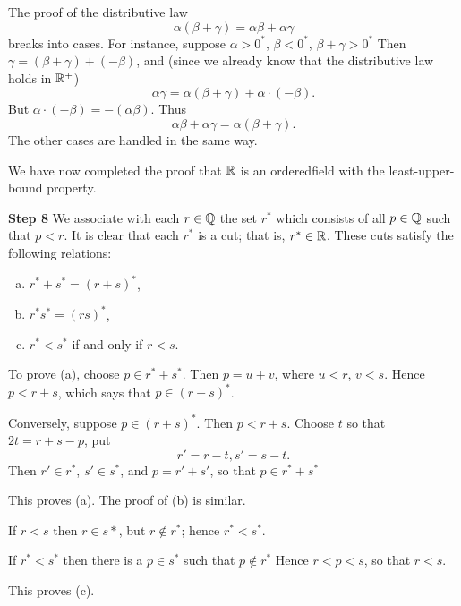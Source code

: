 The proof of the distributive law
\begin{equation*}
    \alpha(\beta + \gamma) = \alpha\beta + \alpha\gamma
\end{equation*}
breaks into cases. For instance, suppose $\alpha> 0^*$, $\beta <0^*$, $\beta + \gamma > 0^*$ Then $\gamma = (\beta + \gamma) + (- \beta)$, and (since we already know that the distributive law holds in ${\protect\mathbb R}^+$)
\begin{equation*}
    \alpha\gamma = \alpha(\beta+\gamma) + \alpha \cdot (-\beta).
\end{equation*}
But $\alpha \cdot (-\beta) = -(\alpha\beta)$. Thus
\begin{equation*}
    \alpha\beta + \alpha\gamma = \alpha(\beta + \gamma).
\end{equation*}
The other cases are handled in the same way.

We have now completed the proof that ${\protect\mathbb R}$ is an orderedfield with the least-upper-bound property.

\textbf{Step 8} 
We associate with each $r\in {\protect\mathbb Q} $ the set $r^*$ 
which consists of all $p \in {\protect\mathbb Q} $ such that $p < r$. 
It is clear that each $r^*$ is a cut; 
that is, $r^* \in {\protect\mathbb R}$. 
These cuts satisfy the following relations:
\begin{enumerate}[(a)]
    \item $r^* + s^* = (r+s)^*$,
    \item $r^* s^* = (rs)^*$,
    \item $r^* < s^*$ if and only if $r < s$.
\end{enumerate}

To prove (a), choose $p \in r^* + s^*$. Then $p=u+v$, where $u<r$, $v<s$.
Hence $p < r +s$, which says that $p \in (r + s)^*$.

Conversely, suppose $p \in (r+s)^*$. Then $p < r + s$. Choose $t$ so that
$2t = r + s - p$, put
\begin{equation*}
    r' = r - t, 
    s' = s - t.
\end{equation*}
Then $r' \in r^*$, $s' \in s^*$, and $p = r' + s'$, so that $p \in r^* + s^*$

This proves (a). The proof of (b) is similar.

If $r < s$ then $r \in s*$, but $r \not\in r^*$; hence $r^* < s^*$.

If $r^* <s^*$ then there is a $p \in s^*$ such that $p \not\in r^*$ Hence $r < p < s$, so that $r < s$.

This proves (c).

